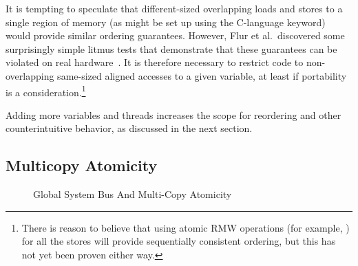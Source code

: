It is tempting to speculate that different-sized overlapping loads
and stores to a single region of memory (as might be set up using
the C-language  keyword) would provide similar ordering
guarantees.
However, Flur et al.~discovered some surprisingly simple
litmus tests that demonstrate that these guarantees can be violated on
real hardware~\cite{Flur:2017:MCA:3093333.3009839}.
It is therefore necessary to restrict code to non-overlapping
same-sized aligned accesses to a given variable, at least if portability
is a consideration.\footnote{
	There is reason to believe that using atomic RMW operations
	(for example, ) for all the stores will
	provide sequentially consistent ordering, but this has not
	yet been proven either way.}

Adding more variables and threads increases the scope for reordering
and other counterintuitive behavior, as discussed in the next section.
\fi

\subsection{Multicopy Atomicity}
\label{sec:memorder:Multicopy Atomicity}

\begin{figure}[tb]
\centering
{}
\caption{Global System Bus And Multi-Copy Atomicity}
\label{fig:memorder:Global System Bus And Multi-Copy Atomicity}
\end{figure}

